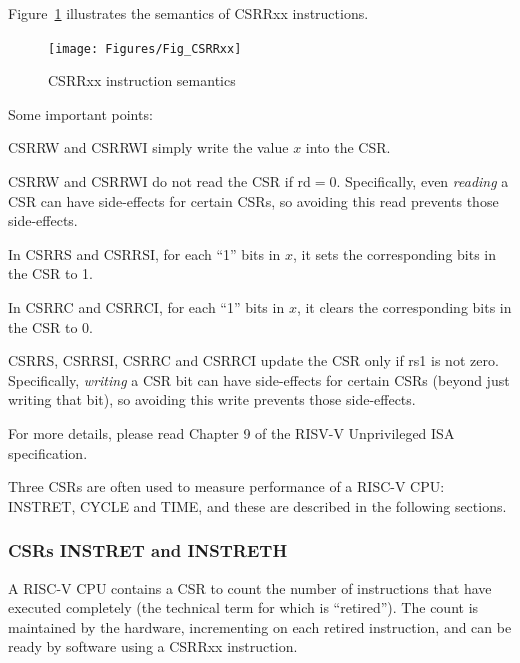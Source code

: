 Figure~\ref{Fig_CSRRxx} illustrates the semantics of CSRRxx instructions.
\begin{figure}[htbp]
  \centerline{\texttt{[image: Figures/Fig\_CSRRxx]}}
  \caption{\label{Fig_CSRRxx} CSRRxx instruction semantics}
\end{figure}
Some important points:

\begin{tightlist}

 \item CSRRW and CSRRWI simply write the value $x$ into the CSR.

 \item CSRRW and CSRRWI do not read the CSR if rd$=0$. Specifically,
       even \emph{reading} a CSR can have side-effects for certain
       CSRs, so avoiding this read prevents those side-effects.

 \item In CSRRS and CSRRSI, for each ``1'' bits in $x$, it sets the
       corresponding bits in the CSR to 1.

 \item In CSRRC and CSRRCI, for each ``1'' bits in $x$, it clears the
       corresponding bits in the CSR to 0.

 \item CSRRS, CSRRSI, CSRRC and CSRRCI update the CSR only if rs1 is
       not zero.  Specifically, \emph{writing} a CSR bit can have
       side-effects for certain CSRs (beyond just writing that bit),
       so avoiding this write prevents those side-effects.

\end{tightlist}

For more details, please read Chapter 9 of the RISV-V Unprivileged ISA
specification.

Three CSRs are often used to measure performance of a RISC-V CPU:
INSTRET, CYCLE and TIME, and these are described in the following
sections.


\subsubsection{CSRs INSTRET and INSTRETH}

\label{Sec_CSRs_INSTRET}

A RISC-V CPU contains a CSR to count the number of instructions that
have executed completely (the technical term for which is
``retired'').  The count is maintained by the hardware, incrementing
on each retired instruction, and can be ready by software using a
CSRRxx instruction.

